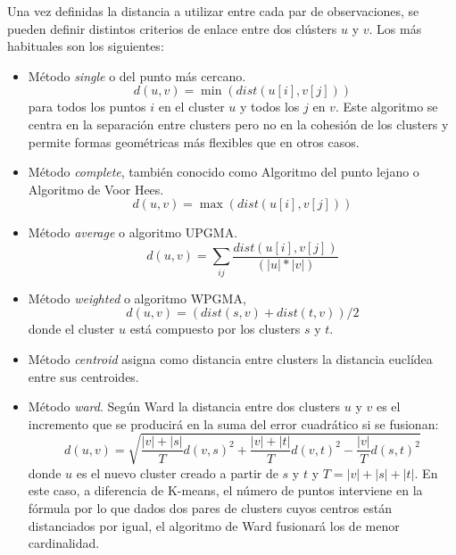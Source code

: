 Una vez definidas la distancia a utilizar entre cada par de observaciones, se pueden definir distintos criterios de enlace entre dos clústers $u$ y $v$. Los más habituales son los siguientes:
\begin{itemize}
\item Método \textit{single} o del punto más cercano. 
    \begin{equation}
    d(u,v) = \min{(dist(u[i], v[j]))} \nonumber
    \end{equation}
para todos los puntos $i$ en el cluster $u$ y todos los $j$ en $v$. Este algoritmo se centra en la separación entre clusters pero no en la cohesión de los clusters y permite formas geométricas más flexibles que en otros casos.
\item Método \textit{complete}, también conocido como Algoritmo del punto lejano o Algoritmo de Voor Hees.
    \begin{equation}
    d(u,v) = \max{(dist(u[i], v[j]))} \nonumber
    \end{equation}
\item Método \textit{average} o algoritmo UPGMA.
    \begin{equation}
    d(u,v) = \sum_{ij}\frac{\displaystyle dist(u[i], v[j])}{(|u| * |v|)} \nonumber
    \end{equation}
\item Método \textit{weighted} o algoritmo WPGMA,
    \begin{equation}
    d(u,v) = (dist(s,v) + dist(t,v))/2
    \end{equation}
donde el cluster $u$ está compuesto por los clusters $s$ y $t$.
\item Método \textit{centroid} asigna como distancia entre clusters la distancia euclídea entre sus centroides.
\item Método \textit{ward}. Según Ward la distancia entre dos clusters $u$ y $v$ es el incremento que se producirá en la suma del error cuadrático si se fusionan:
    \begin{equation}
    d(u,v) = \sqrt{\frac{|v|+|s|}{T}d(v,s)^2 + \frac{|v|+|t|}{T}d(v,t)^2 - \frac{|v|}{T}d(s,t)^2}
    \end{equation}
donde $u$ es el nuevo cluster creado a partir de $s$ y $t$ y $T=|v|+|s|+|t|$. En este caso, a diferencia de K-means, el número de puntos interviene en la fórmula por lo que dados dos pares de clusters cuyos centros están distanciados por igual, el algoritmo de Ward fusionará los de menor cardinalidad.
\end{itemize}

